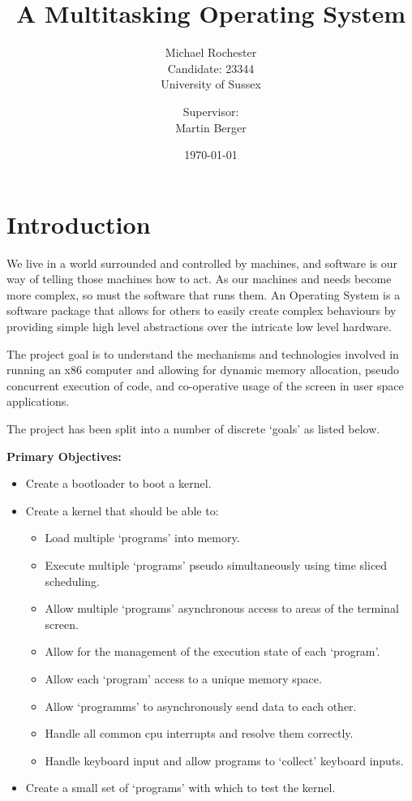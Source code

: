 \documentclass[a4paper]{report}
\title{A Multitasking Operating System}
\date{\today}
\author{Michael Rochester\\ Candidate: 23344\\ University of Sussex
        \and Supervisor:\\ Martin Berger}
\begin{document}
\titlespacing*{\chapter}{0pt}{-50pt}{20pt}
\titleformat{\chapter}[display]{\normalfont\huge\bfseries}{\chaptertitlename\ \thechapter}{20pt}{\Huge}


\maketitle

\tableofcontents
\listoffigures

\chapter{Introduction}
We live in a world surrounded and controlled by machines, and software is our way of telling those machines how to act. As our machines and needs become more complex, so must the software that runs them. An Operating System is a software package that allows for others to easily create complex behaviours by providing simple high level abstractions over the intricate low level hardware.

The project goal is to understand the mechanisms and technologies involved in running an x86 computer and allowing for dynamic memory allocation, pseudo concurrent execution of code, and co-operative usage of the screen in user space applications.

The project has been split into a number of discrete `goals' as listed below.


\textbf {Primary Objectives:}

\begin{itemize}
\item Create a bootloader to boot a kernel.
\item Create a kernel that should be able to:
\begin{itemize}
\item Load multiple `programs' into memory.
\item Execute multiple `programs' pseudo simultaneously using time sliced scheduling.
\item Allow multiple `programs' asynchronous access to areas of the terminal screen.
\item Allow for the management of the execution state of each `program'.
\item Allow each `program' access to a unique memory space.
\item Allow `programms' to asynchronously send data to each other.
\item Handle all common cpu interrupts and resolve them correctly.
\item Handle keyboard input and allow programs to `collect' keyboard inputs.
\end{itemize}
\item Create a small set of `programs' with which to test the kernel.
\end{itemize}
\end{document}
